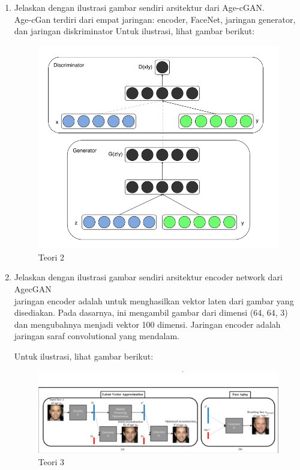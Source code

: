 \begin{enumerate}
\item Jelaskan dengan ilustrasi gambar sendiri arsitektur dari Age-cGAN.
	\hfill\\
	 Age-cGan terdiri dari empat jaringan: encoder, FaceNet, jaringan generator, dan jaringan diskriminator 
	Untuk ilustrasi, lihat gambar berikut:  

\begin{figure}[H]
    \includegraphics[width=12cm]{figures/1174084/9/teori2.png}
    \centering
    \caption{Teori 2}
\end{figure}

\item Jelaskan dengan ilustrasi gambar sendiri arsitektur encoder network dari AgecGAN
	\hfill\\
	 jaringan encoder adalah untuk menghasilkan vektor laten dari gambar yang disediakan. Pada dasarnya, ini mengambil gambar dari dimensi (64, 64, 3) dan mengubahnya menjadi vektor 100 dimensi. Jaringan encoder adalah jaringan saraf convolutional yang mendalam.
	
	Untuk ilustrasi, lihat gambar berikut:

\begin{figure}[H]
    \includegraphics[width=12cm]{figures/1174084/9/teori345.png}
    \centering
    \caption{Teori 3}
\end{figure}


\end{enumerate}
